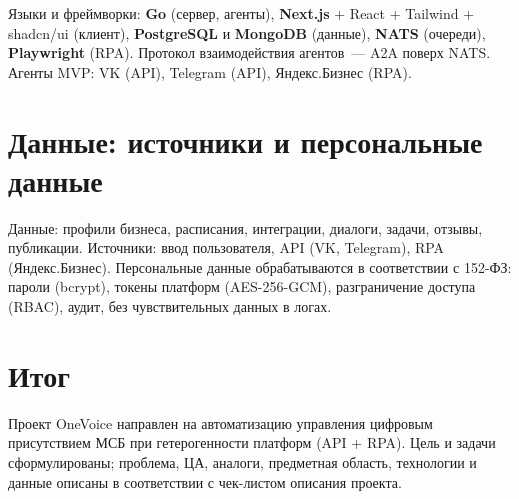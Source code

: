 Языки и фреймворки: \textbf{Go} (сервер, агенты), \textbf{Next.js} + React + Tailwind + shadcn/ui (клиент), \textbf{PostgreSQL} и \textbf{MongoDB} (данные), \textbf{NATS} (очереди), \textbf{Playwright} (RPA). Протокол взаимодействия агентов~--- A2A поверх NATS. Агенты MVP: VK (API), Telegram (API), Яндекс.Бизнес (RPA).

\section{Данные: источники и персональные данные}

Данные: профили бизнеса, расписания, интеграции, диалоги, задачи, отзывы, публикации. Источники: ввод пользователя, API (VK, Telegram), RPA (Яндекс.Бизнес). Персональные данные обрабатываются в соответствии с 152-ФЗ: пароли (bcrypt), токены платформ (AES-256-GCM), разграничение доступа (RBAC), аудит, без чувствительных данных в логах.

\section{Итог}

Проект OneVoice направлен на автоматизацию управления цифровым присутствием МСБ при гетерогенности платформ (API + RPA). Цель и задачи сформулированы; проблема, ЦА, аналоги, предметная область, технологии и данные описаны в соответствии с чек-листом описания проекта.
